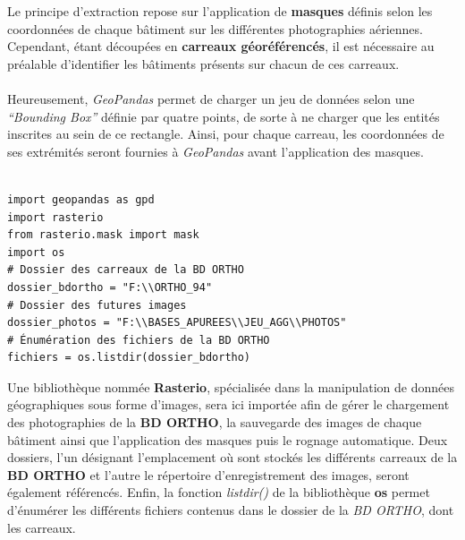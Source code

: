 \documentclass[
  11pt,
  french,
]{article}
\begin{document}
Le principe d'extraction repose sur l'application de \textbf{masques}
définis selon les coordonnées de chaque bâtiment sur les différentes
photographies aériennes. Cependant, étant découpées en \textbf{carreaux
géoréférencés}, il est nécessaire au préalable d'identifier les
bâtiments présents sur chacun de ces carreaux.\\
~\\
Heureusement, \emph{GeoPandas} permet de charger un jeu de données selon
une \emph{``Bounding Box''} définie par quatre points, de sorte à ne
charger que les entités inscrites au sein de ce rectangle. Ainsi, pour
chaque carreau, les coordonnées de ses extrémités seront fournies à
\emph{GeoPandas} avant l'application des masques.\\
~\\

\begin{tcolorbox}[title= Import des bibliothèques et ressources ,colback=boitecode]
\begin{lstlisting}[style=code]
import geopandas as gpd
import rasterio
from rasterio.mask import mask
import os
# Dossier des carreaux de la BD ORTHO
dossier_bdortho = "F:\\ORTHO_94"
# Dossier des futures images
dossier_photos = "F:\\BASES_APUREES\\JEU_AGG\\PHOTOS"
# Énumération des fichiers de la BD ORTHO
fichiers = os.listdir(dossier_bdortho)\end{lstlisting}
\end{tcolorbox}

Une bibliothèque nommée \textbf{Rasterio}, spécialisée dans la
manipulation de données géographiques sous forme d'images, sera ici
importée afin de gérer le chargement des photographies de la \textbf{BD
ORTHO}, la sauvegarde des images de chaque bâtiment ainsi que
l'application des masques puis le rognage automatique. Deux dossiers,
l'un désignant l'emplacement où sont stockés les différents carreaux de
la \textbf{BD ORTHO} et l'autre le répertoire d'enregistrement des
images, seront également référencés. Enfin, la fonction \emph{listdir()}
de la bibliothèque \textbf{os} permet d'énumérer les différents fichiers
contenus dans le dossier de la \emph{BD ORTHO}, dont les carreaux.
\end{document}
